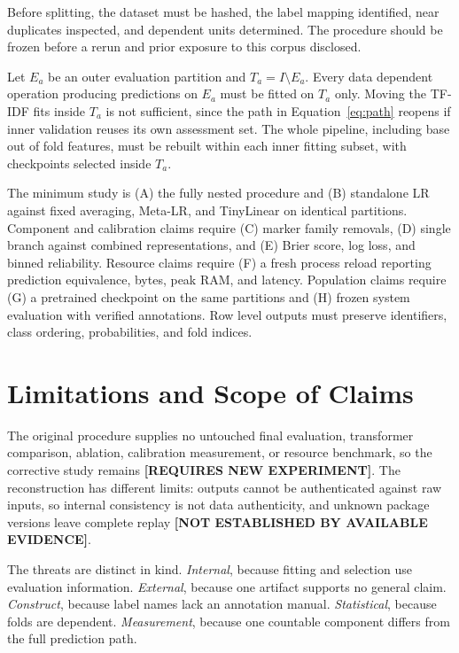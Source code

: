 \documentclass[runningheads]{llncs}
\newcommand{\needexp}{\textbf{[REQUIRES NEW EXPERIMENT]}}
\newcommand{\notestablished}{\textbf{[NOT ESTABLISHED BY AVAILABLE EVIDENCE]}}
\begin{document}
Before splitting, the dataset must be hashed, the label mapping identified, near duplicates inspected, and dependent units determined. The procedure should be frozen before a rerun and prior exposure to this corpus disclosed.

Let $E_a$ be an outer evaluation partition and $T_a = I \setminus E_a$. Every data dependent operation producing predictions on $E_a$ must be fitted on $T_a$ only. Moving the TF-IDF fits inside $T_a$ is not sufficient, since the path in Equation~\ref{eq:path} reopens if inner validation reuses its own assessment set. The whole pipeline, including base out of fold features, must be rebuilt within each inner fitting subset, with checkpoints selected inside $T_a$.

The minimum study is (A) the fully nested procedure and (B) standalone LR against fixed averaging, Meta-LR, and TinyLinear on identical partitions. Component and calibration claims require (C) marker family removals, (D) single branch against combined representations, and (E) Brier score, log loss, and binned reliability. Resource claims require (F) a fresh process reload reporting prediction equivalence, bytes, peak RAM, and latency. Population claims require (G) a pretrained checkpoint on the same partitions and (H) frozen system evaluation with verified annotations. Row level outputs must preserve identifiers, class ordering, probabilities, and fold indices.

\section{Limitations and Scope of Claims}
\label{sec:limitations}

The original procedure supplies no untouched final evaluation, transformer comparison, ablation, calibration measurement, or resource benchmark, so the corrective study remains \needexp{}. The reconstruction has different limits: outputs cannot be authenticated against raw inputs, so internal consistency is not data authenticity, and unknown package versions leave complete replay \notestablished{}.

The threats are distinct in kind. \emph{Internal}, because fitting and selection use evaluation information. \emph{External}, because one artifact supports no general claim. \emph{Construct}, because label names lack an annotation manual. \emph{Statistical}, because folds are dependent. \emph{Measurement}, because one countable component differs from the full prediction path.
\end{document}
